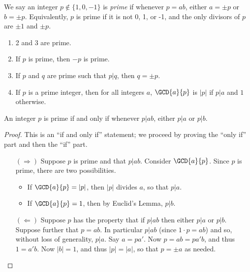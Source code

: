 \documentclass{article}
\begin{document}

\begin{dfn}[Prime]
We say an integer $p \notin \{1,0,-1\}$ is \emph{prime} if whenever $p = ab$, either $a = \pm p$ or $b = \pm p$. Equivalently, $p$ is prime if it is not 0, 1, or -1, and the only divisors of $p$ are $\pm 1$ and $\pm p$.
\end{dfn}

\begin{prop} \mbox{}
\begin{enumerate}
\item 2 and 3 are prime.
\item If $p$ is prime, then $-p$ is prime.
\item If $p$ and $q$ are prime such that $p|q$, then $q = \pm p$.
\item If $p$ is a prime integer, then for all integers $a$, $\GCD{a}{p}$ is $|p|$ if $p|a$ and $1$ otherwise.
\end{enumerate}
\end{prop}

\begin{prop}
An integer $p$ is prime if and only if whenever $p|ab$, either $p|a$ or $p|b$.
\end{prop}

\begin{proof}
This is an ``if and only if'' statement; we proceed by proving the ``only if'' part and then the ``if'' part.
\begin{itemize}
\item[$(\Rightarrow)$] Suppose $p$ is prime and that $p|ab$. Consider $\GCD{a}{p}$. Since $p$ is prime, there are two possibilities.
\begin{itemize}
\item If $\GCD{a}{p} = |p|$, then $|p|$ divides $a$, so that $p|a$.
\item If $\GCD{a}{p} = 1$, then by Euclid's Lemma, $p|b$.
\end{itemize}

\item[$(\Leftarrow)$] Suppose $p$ has the property that if $p|ab$ then either $p|a$ or $p|b$. Suppose further that $p = ab$. In particular $p|ab$ (since $1 \cdot p = ab$) and so, without loss of generality, $p|a$. Say $a = pa'$. Now $p = ab = pa'b$, and thus $1 = a'b$. Now $|b| = 1$, and thus $|p| = |a|$, so that $p = \pm a$ as needed. \qedhere
\end{itemize}
\end{proof}
\end{document}

